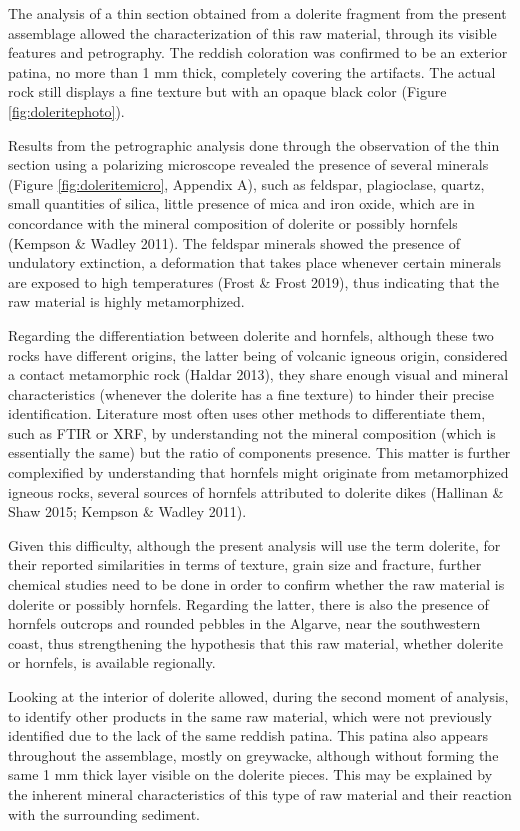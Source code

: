\documentclass[12pt,twoside]{reedthesis}
\begin{document}
The analysis of a thin section obtained from a dolerite fragment from the present assemblage allowed the characterization of this raw material, through its visible features and petrography. The reddish coloration was confirmed to be an exterior patina, no more than 1 mm thick, completely covering the artifacts. The actual rock still displays a fine texture but with an opaque black color (Figure \ref{fig:doleritephoto}).

Results from the petrographic analysis done through the observation of the thin section using a polarizing microscope revealed the presence of several minerals (Figure \ref{fig:doleritemicro}, Appendix A), such as feldspar, plagioclase, quartz, small quantities of silica, little presence of mica and iron oxide, which are in concordance with the mineral composition of dolerite or possibly hornfels (Kempson \& Wadley 2011). The feldspar minerals showed the presence of undulatory extinction, a deformation that takes place whenever certain minerals are exposed to high temperatures (Frost \& Frost 2019), thus indicating that the raw material is highly metamorphized.

Regarding the differentiation between dolerite and hornfels, although these two rocks have different origins, the latter being of volcanic igneous origin, considered a contact metamorphic rock (Haldar 2013), they share enough visual and mineral characteristics (whenever the dolerite has a fine texture) to hinder their precise identification. Literature most often uses other methods to differentiate them, such as FTIR or XRF, by understanding not the mineral composition (which is essentially the same) but the ratio of components presence. This matter is further complexified by understanding that hornfels might originate from metamorphized igneous rocks, several sources of hornfels attributed to dolerite dikes (Hallinan \& Shaw 2015; Kempson \& Wadley 2011).

Given this difficulty, although the present analysis will use the term dolerite, for their reported similarities in terms of texture, grain size and fracture, further chemical studies need to be done in order to confirm whether the raw material is dolerite or possibly hornfels. Regarding the latter, there is also the presence of hornfels outcrops and rounded pebbles in the Algarve, near the southwestern coast, thus strengthening the hypothesis that this raw material, whether dolerite or hornfels, is available regionally.

Looking at the interior of dolerite allowed, during the second moment of analysis, to identify other products in the same raw material, which were not previously identified due to the lack of the same reddish patina. This patina also appears throughout the assemblage, mostly on greywacke, although without forming the same 1 mm thick layer visible on the dolerite pieces. This may be explained by the inherent mineral characteristics of this type of raw material and their reaction with the surrounding sediment.
\end{document}
